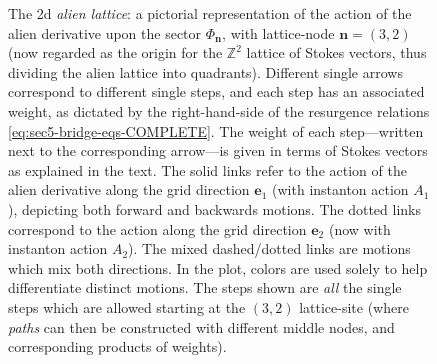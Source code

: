 \documentclass[11pt,a4paper]{article}
\def\BZ{{\mathbb Z}}
\begin{document}
\begin{figure}[t!]
\caption {The 2d \textit{alien lattice}: a pictorial representation of the action of the alien derivative upon the sector $\Phi_{\boldsymbol{n}}$, with lattice-node $\boldsymbol{n}=(3,2)$ (now regarded as the origin for the $\BZ^2$ lattice of Stokes vectors, thus dividing the alien lattice into quadrants). Different single arrows correspond to different single steps, and each step has an associated weight, as dictated by the right-hand-side of the resurgence relations \eqref{eq:sec5-bridge-eqs-COMPLETE}. The weight of each step---written next to the corresponding arrow---is given in terms of Stokes vectors as explained in the text. The solid links refer to the action of the alien derivative along the grid direction $\boldsymbol{e}_1$ (with instanton action $A_1$), depicting both forward and backwards motions. The dotted links correspond to the action along the grid direction $\boldsymbol{e}_2$ (now with instanton action $A_2$). The mixed dashed/dotted links are motions which mix both directions. In the plot, colors are used solely to help differentiate distinct motions. The steps shown are \textit{all} the single steps which are allowed starting at the $(3,2)$ lattice-site (where \textit{paths} can then be constructed with different middle nodes, and corresponding products of weights).
}
\label{fig:sec5-2d-lattice}
\end{figure} 
\end{document}
